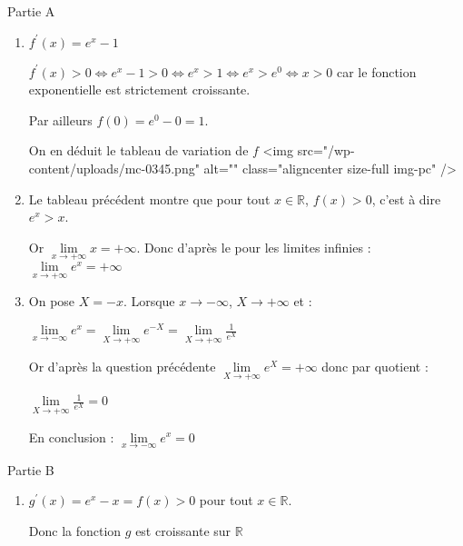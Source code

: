 \begin{corrige}
     \begin{h3}Partie A\end{h3}
     \begin{enumerate}
          \item
          $f^{\prime}\left(x\right)=e^{x}-1$
          \par
          $f^{\prime}\left(x\right) > 0  \Leftrightarrow  e^{x}-1 > 0  \Leftrightarrow  e^{x} > 1  \Leftrightarrow  e^{x} > e^{0}  \Leftrightarrow   x > 0$ car le fonction exponentielle est strictement croissante.
          \par
          Par ailleurs $f\left(0\right)=e^{0}-0=1$.
          \par
          On en déduit le tableau de variation de $f$
          <img src="/wp-content/uploads/mc-0345.png" alt="" class="aligncenter size-full  img-pc" />
          \item
          Le tableau précédent montre que pour tout $x \in  \mathbb{R}$, $f\left(x\right) > 0$, c'est à dire $e^{x} > x$.
          \par
          Or $\lim\limits_{x\rightarrow +\infty }x=+\infty $. Donc d'après le   pour les limites infinies : $\lim\limits_{x\rightarrow +\infty }e^{x}=+\infty $
          \item
          On pose $X=-x$. Lorsque $x\rightarrow -\infty $, $X\rightarrow +\infty $ et :
          \par
          $\lim\limits_{x\rightarrow -\infty }e^{x}=\lim\limits_{X\rightarrow +\infty }e^{-X}=\lim\limits_{X\rightarrow +\infty }\frac{1}{e^{X}}$
          \par
          Or d'après la question précédente $\lim\limits_{X\rightarrow +\infty }e^{X}=+\infty $ donc par quotient :
          \par
          $\lim\limits_{X\rightarrow +\infty }\frac{1}{e^{X}}=0$
          \par
          En conclusion :  $\lim\limits_{x\rightarrow -\infty }e^{x}=0$
     \end{enumerate}
     \begin{h3}Partie B\end{h3}
     \begin{enumerate}
          \item
          $g^{\prime}\left(x\right)=e^{x}-x=f\left(x\right) > 0$ pour tout $x \in  \mathbb{R}$.
          \par
          Donc la fonction $g$ est croissante sur $\mathbb{R}$

\end{enumerate}
\end{corrige}
